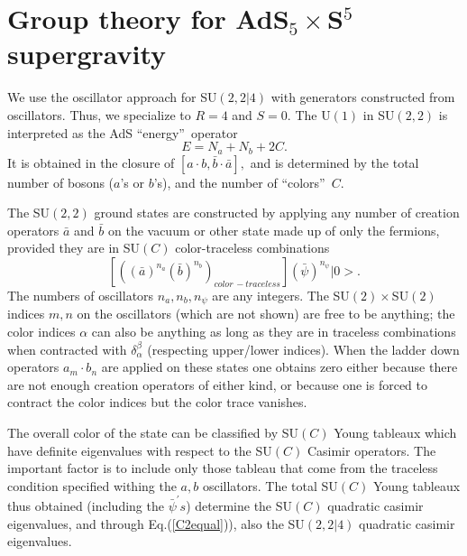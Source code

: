 \documentclass[a4paper,aps,preprint,nofootinbib]{revtex4}
\begin{document}
\section{Group theory for AdS$_{5}\times$S$^{5}$ supergravity}

We use the oscillator approach for SU$\left( 2,2|4\right) $ with generators
constructed from oscillators. Thus, we specialize to $R=4$ and $S=0.$ The U$%
\left( 1\right) $ in SU$\left( 2,2\right) $ is interpreted as the AdS
\textquotedblleft energy\textquotedblright\ operator
\begin{equation}
E=N_{a}+N_{b}+2C.  \label{E}
\end{equation}
It is obtained in the closure of $\left[ a\cdot b,\bar{b}\cdot\bar{a}\right]
,$ and is determined by the total number of bosons ($a$'s or $b$'s), and the
number of \textquotedblleft colors\textquotedblright\ $C.$

The SU$\left( 2,2\right) $ ground states are constructed by applying any
number of creation operators $\bar{a}$ and $\bar{b}$ on the vacuum or other
state made up of only the fermions, provided they are in SU$\left( C\right) $
color-traceless combinations
\begin{equation}
\left[ (\left( \bar{a}\right) ^{n_{a}}\left( \bar{b}\right)
^{n_{b}})_{color\,-traceless}\right] \left( \bar{\psi}\right) ^{n_{\psi}}|0>.
\end{equation}
The numbers of oscillators $n_{a},n_{b},n_{\psi}$ are any integers. The SU$%
\left( 2\right) \times$SU$\left( 2\right) $ indices $m,n$ on the oscillators
(which are not shown) are free to be anything; the color indices $\alpha$
can also be anything as long as they are in traceless combinations when
contracted with $\delta_{\alpha}^{\beta}$ (respecting upper/lower indices).
When the ladder down operators $a_{m}\cdot b_{n}$ are applied on these
states one obtains zero either because there are not enough creation
operators of either kind, or because one is forced to contract the color
indices but the color trace vanishes.

The overall color of the state can be classified by SU$\left( C\right) $
Young tableaux which have definite eigenvalues with respect to the SU$\left(
C\right) $ Casimir operators. The important factor is to include only those
tableau that come from the traceless condition specified withing the $a,b$
oscillators. The total SU$\left( C\right) $ Young tableaux thus obtained
(including the $\bar{\psi}^{\prime}s$) determine the SU$\left( C\right) $
quadratic casimir eigenvalues, and through Eq.(\ref{C2equal})), also the SU$%
\left( 2,2|4\right) $ quadratic casimir eigenvalues.
\end{document}
